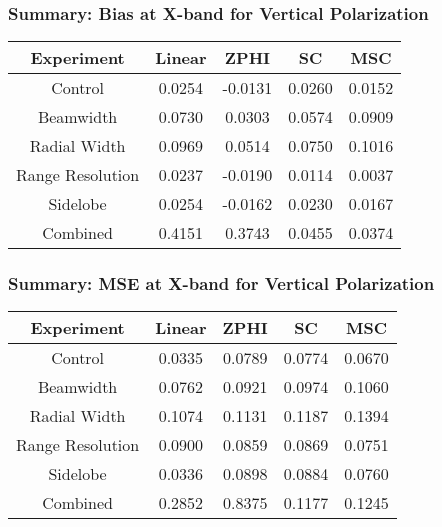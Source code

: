 \begin{frame}
    \frametitle{Summary: Bias at X-band for Vertical Polarization}
    \begin{center}
        \begin{tabular}{| c | c | c | c | c |}
            \hline
            Experiment & Linear & ZPHI & SC & MSC \\
            \hline
            \hline
            Control & 0.0254 & -0.0131 & 0.0260 & 0.0152 \\
            Beamwidth & 0.0730 & 0.0303 & 0.0574 & 0.0909 \\
            Radial Width & 0.0969 & 0.0514 & 0.0750 & 0.1016 \\
            Range Resolution & 0.0237 & -0.0190 & 0.0114 & 0.0037 \\
            Sidelobe & 0.0254 & -0.0162 & 0.0230 & 0.0167 \\
            Combined & 0.4151 & 0.3743 & 0.0455 & 0.0374 \\
            \hline
        \end{tabular}
    \end{center}
\end{frame}

\begin{frame}
    \frametitle{Summary: MSE at X-band for Vertical Polarization}
    \begin{center}
        \begin{tabular}{| c | c | c | c | c |}
            \hline
            Experiment & Linear & ZPHI & SC & MSC \\
            \hline
            \hline
            Control & 0.0335 & 0.0789 & 0.0774 & 0.0670 \\
            Beamwidth & 0.0762 & 0.0921 & 0.0974 & 0.1060 \\
            Radial Width & 0.1074 & 0.1131 & 0.1187 & 0.1394 \\
            Range Resolution & 0.0900 & 0.0859 & 0.0869 & 0.0751 \\
            Sidelobe & 0.0336 & 0.0898 & 0.0884 & 0.0760 \\
            Combined & 0.2852 & 0.8375 & 0.1177 & 0.1245 \\
            \hline
        \end{tabular}
    \end{center}
\end{frame}

